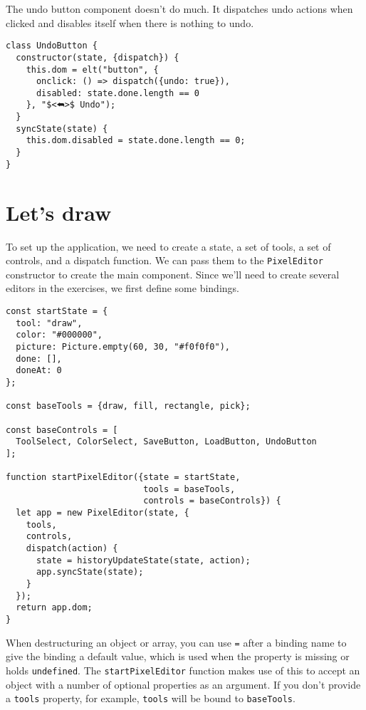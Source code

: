 The undo button component doesn't do much. It dispatches undo actions when clicked and disables itself when there is nothing to undo.

\begin{lstlisting}
class UndoButton {
  constructor(state, {dispatch}) {
    this.dom = elt("button", {
      onclick: () => dispatch({undo: true}),
      disabled: state.done.length == 0
    }, "$<⮪>$ Undo");
  }
  syncState(state) {
    this.dom.disabled = state.done.length == 0;
  }
}
\end{lstlisting}
\noindent

\section{Let's draw}

To set up the application, we need to create a state, a set of tools, a set of controls, and a dispatch function. We can pass them to the \lstinline`PixelEditor` constructor to create the main component. Since we'll need to create several editors in the exercises, we first define some bindings.

\begin{lstlisting}
const startState = {
  tool: "draw",
  color: "#000000",
  picture: Picture.empty(60, 30, "#f0f0f0"),
  done: [],
  doneAt: 0
};

const baseTools = {draw, fill, rectangle, pick};

const baseControls = [
  ToolSelect, ColorSelect, SaveButton, LoadButton, UndoButton
];

function startPixelEditor({state = startState,
                           tools = baseTools,
                           controls = baseControls}) {
  let app = new PixelEditor(state, {
    tools,
    controls,
    dispatch(action) {
      state = historyUpdateState(state, action);
      app.syncState(state);
    }
  });
  return app.dom;
}
\end{lstlisting}
\noindent{}

When destructuring an object or array, you can use \lstinline`=` after a binding name to give the binding a default value, which is used when the property is missing or holds \lstinline`undefined`. The \lstinline`startPixelEditor` function makes use of this to accept an object with a number of optional properties as an argument. If you don't provide a \lstinline`tools` property, for example, \lstinline`tools` will be bound to \lstinline`baseTools`.


